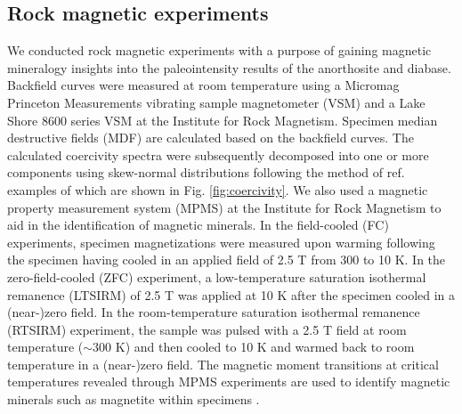 \documentclass[9pt,twocolumn,twoside,lineno]{pnas-new}
\begin{document}
{%


\subsection*{Rock magnetic experiments}

We conducted rock magnetic experiments with a purpose of gaining magnetic mineralogy insights into the paleointensity results of the anorthosite and diabase. Backfield curves were measured at room temperature using a Micromag Princeton Measurements vibrating sample magnetometer (VSM) and a Lake Shore 8600 series VSM at the Institute for Rock Magnetism. Specimen median destructive fields (MDF) are calculated based on the backfield curves. The calculated coercivity spectra were subsequently decomposed into one or more components using skew-normal distributions following the method of ref. \citealp{Maxbauer2016a} examples of which are shown in Fig. \ref{fig:coercivity}. We also used a magnetic property measurement system (MPMS) at the Institute for Rock Magnetism to aid in the identification of magnetic minerals. In the field-cooled (FC) experiments, specimen magnetizations were measured upon warming following the specimen having cooled in an applied field of 2.5 T from 300 to 10 K. In the zero-field-cooled (ZFC) experiment, a low-temperature saturation isothermal remanence (LTSIRM) of 2.5 T was applied at 10 K after the specimen cooled in a (near-)zero field. In the room-temperature saturation isothermal remanence (RTSIRM) experiment, the sample was pulsed with a 2.5 T field at room temperature ($\sim$300 K) and then cooled to 10 K and warmed back to room temperature in a (near-)zero field. The magnetic moment transitions at critical temperatures revealed through MPMS experiments are used to identify magnetic minerals such as magnetite within specimens \cite{Feinberg2015a}. 

}
\end{document}
